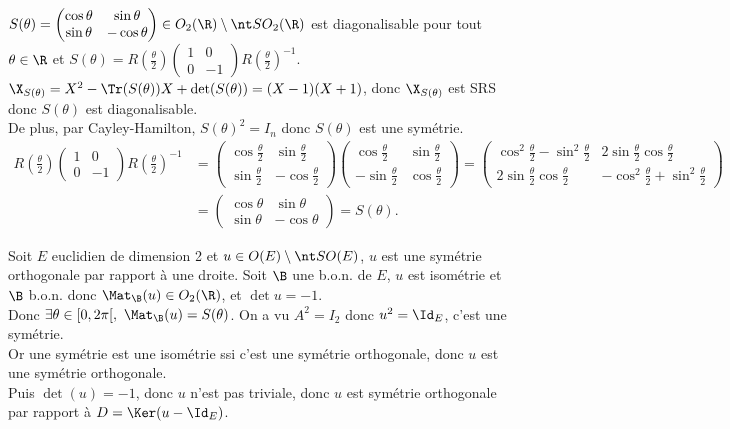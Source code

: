 \documentclass[11pt]{article}
\begin{document}
\begin{prop}{}{}
    $S(\theta)=\begin{pmatrix}\cos\theta&\sin\theta\\\sin\theta&-\cos\theta\end{pmatrix}\in O_2(\R)\setminus\SO_2(\R)$ est diagonalisable pour tout $\theta\in\R$ et $S(\theta)=R(\frac{\theta}{2})\begin{pmatrix}1&0\\0&-1\end{pmatrix}R(\frac{\theta}{2})^{-1}$.
    \tcblower
    $\X_{S(\theta)}=X^2-\Tr(S(\theta))X+\det(S(\theta))=(X-1)(X+1)$, donc $\X_{S(\theta)}$ est SRS donc $S(\theta)$ est diagonalisable.\\
    De plus, par Cayley-Hamilton, $S(\theta)^2=I_n$ donc $S(\theta)$ est une symétrie.
    \begin{align*}
        R\left( \frac{\theta}{2} \right)\begin{pmatrix}1&0\\0&-1\end{pmatrix}R\left( \frac{\theta}{2} \right)^{-1} &= \begin{pmatrix}\cos\frac{\theta}{2} & \sin\frac{\theta}{2} \\ \sin\frac{\theta}{2} & -\cos\frac{\theta}{2} \end{pmatrix} \begin{pmatrix}\cos\frac{\theta}{2} & \sin\frac{\theta}{2} \\ -\sin\frac{\theta}{2} & \cos\frac{\theta}{2}\end{pmatrix} =\begin{pmatrix}\cos^2\frac{\theta}{2}-\sin^2\frac{\theta}{2} & 2\sin\frac{\theta}{2}\cos\frac{\theta}{2} \\ 2\sin\frac{\theta}{2}\cos\frac{\theta}{2} & -\cos^2\frac{\theta}{2}+\sin^2\frac{\theta}{2}\end{pmatrix}\\
        &=\begin{pmatrix}\cos\theta & \sin\theta \\ \sin\theta & -\cos\theta \end{pmatrix} = S(\theta).
    \end{align*}
\end{prop}

\begin{prop}{}{}
    Soit $E$ euclidien de dimension 2 et $u\in O(E)\setminus\SO(E)$, $u$ est une symétrie orthogonale par rapport à une droite.
    \tcblower
    Soit $\B$ une b.o.n. de $E$, $u$ est isométrie et $\B$ b.o.n. donc $\Mat_\B(u)\in O_2(\R)$, et $\det u=-1$.\\
    Donc $\exists \theta \in [0,2\pi[, ~ \Mat_\B(u)=S(\theta)$. On a vu $A^2=I_2$ donc $u^2=\Id_E$, c'est une symétrie.\\
    Or une symétrie est une isométrie ssi c'est une symétrie orthogonale, donc $u$ est une symétrie orthogonale.\\
    Puis $\det(u)=-1$, donc $u$ n'est pas triviale, donc $u$ est symétrie orthogonale par rapport à $D=\Ker(u-\Id_E)$.
\end{prop}
\end{document}
